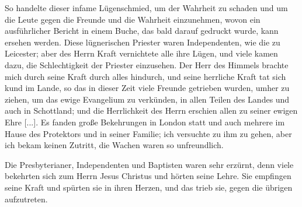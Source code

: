 So handelte dieser
infame Lügenschmied, um der Wahrheit zu schaden und um die
Leute gegen die Freunde und die Wahrheit einzunehmen, wovon
ein ausführlicher Bericht in einem Buche, das bald darauf 
gedruckt wurde, kann ersehen werden. Diese lügnerischen Priester
waren Independenten, wie die zu 
Leicester; aber des Herrn
Kraft vernichtete alle ihre Lügen, und viele kamen dazu, die
Schlechtigkeit der Priester einzusehen. Der Herr des Himmels
brachte mich durch seine Kraft durch alles hindurch, und seine
herrliche Kraft tat sich kund im Lande, so das in dieser Zeit
viele Freunde getrieben wurden, umher zu ziehen, um das ewige
Evangelium zu verkünden, in allen Teilen des Landes und auch
in Schottland; und die Herrlichkeit des Herrn erschien allen zu
seiner ewigen Ehre [...]. Es fanden große Bekehrungen in
London statt und auch mehrere im Hause des Protektors und in
seiner Familie; ich versuchte zu ihm zu gehen, aber ich bekam
keinen Zutritt, die Wachen waren so unfreundlich.


Die Presbyterianer, Independenten 
und Baptisten waren sehr
erzürnt, denn viele bekehrten sich zum Herrn Jesus Christus und
hörten seine Lehre. Sie empfingen seine Kraft und spürten sie
in ihren Herzen, und das trieb sie, gegen die übrigen 
aufzutreten.
